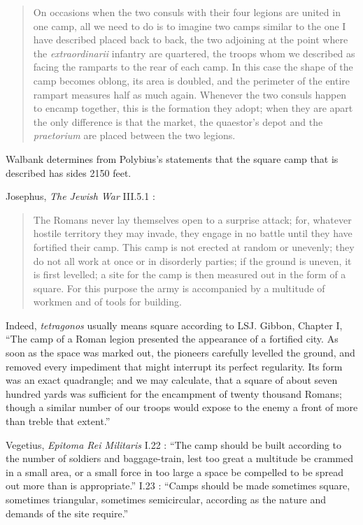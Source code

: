 \documentclass{amsart}
\theoremstyle{definition}
\begin{document}
\begin{quote}
On occasions when the two consuls with their four legions are united in one camp, all we need to do is to imagine two camps similar to the one I have described placed
back to back, the two adjoining at the point where the {\em extraordinarii} infantry are quartered, the troops whom we described as facing the ramparts to the rear of each
camp. In this case the shape of the camp becomes oblong, its area is doubled, and the perimeter of the entire rampart measures half as much again. Whenever the two
consuls happen to encamp together, this is the formation they adopt; when they are apart the only difference is that the market, the quaestor's depot and the {\em praetorium}
are placed between the two legions.
\end{quote}

Walbank \cite[p.~715]{walbankII} determines from Polybius's statements that 
the square camp that is described has sides 2150 feet. 

Josephus, {\em The Jewish War} III.5.1 \cite[p.~599]{josephus}: 

\begin{quote}
The Romans never lay themselves open to a surprise attack; for, whatever hostile territory they may invade, they engage in no battle until they have fortified their camp.
This camp is not erected at random or unevenly; they do not all work at once or in disorderly parties; if the ground is uneven, it is first levelled; 
a site for the camp is then measured out in the form of a square. For this purpose the army is accompanied by a multitude of workmen and of tools for building.
\end{quote}

Indeed, {\em tetragonos} usually means square according to LSJ. Gibbon, Chapter I, ``The camp of a Roman legion
presented the appearance of a fortified city. As soon as the space was marked out, the pioneers carefully levelled
the ground, and removed every impediment that might interrupt its perfect regularity.
Its form was an exact quadrangle; and we may
calculate, that a square of about seven hundred yards was sufficient for the encampment of twenty thousand Romans; though a similar number
of our troops would expose to the enemy a front of more than treble that extent.''

Vegetius, {\em Epitoma Rei Militaris} 
I.22 \cite[p.~24]{vegetius}: ``The camp should be built according to the number of soldiers and baggage-train, lest too great
a multitude be crammed in a small area, or a small force in too large a space be compelled to be spread
out more than is appropriate.''
I.23 \cite[p.~24]{vegetius}: ``Camps should be made sometimes square, sometimes triangular,
sometimes semicircular, according as the nature and demands of the site require.''
\end{document}
